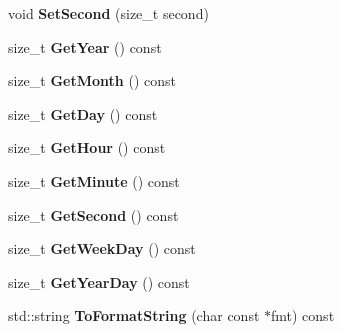 \begin{DoxyCompactItemize}
\item 
\hypertarget{classlsf_1_1util_1_1Date_aa2febb5b562ec67feb064a2233784796}{
void {\bfseries SetSecond} (size\_\-t second)}
\label{classlsf_1_1util_1_1Date_aa2febb5b562ec67feb064a2233784796}

\item 
\hypertarget{classlsf_1_1util_1_1Date_a361242a0c75f6aa38d56d86cd7ac269a}{
size\_\-t {\bfseries GetYear} () const }
\label{classlsf_1_1util_1_1Date_a361242a0c75f6aa38d56d86cd7ac269a}

\item 
\hypertarget{classlsf_1_1util_1_1Date_a790816ca0e33bc3bc11f6e916a9ef11c}{
size\_\-t {\bfseries GetMonth} () const }
\label{classlsf_1_1util_1_1Date_a790816ca0e33bc3bc11f6e916a9ef11c}

\item 
\hypertarget{classlsf_1_1util_1_1Date_adbe17431f5edb15fb3805db103aa993f}{
size\_\-t {\bfseries GetDay} () const }
\label{classlsf_1_1util_1_1Date_adbe17431f5edb15fb3805db103aa993f}

\item 
\hypertarget{classlsf_1_1util_1_1Date_a0c41a20b8a404695cef635a537ae79cb}{
size\_\-t {\bfseries GetHour} () const }
\label{classlsf_1_1util_1_1Date_a0c41a20b8a404695cef635a537ae79cb}

\item 
\hypertarget{classlsf_1_1util_1_1Date_ac7edf4c564739f8dff353835a447980e}{
size\_\-t {\bfseries GetMinute} () const }
\label{classlsf_1_1util_1_1Date_ac7edf4c564739f8dff353835a447980e}

\item 
\hypertarget{classlsf_1_1util_1_1Date_a2674a5fbb86ff6c71ba90593d39934d1}{
size\_\-t {\bfseries GetSecond} () const }
\label{classlsf_1_1util_1_1Date_a2674a5fbb86ff6c71ba90593d39934d1}

\item 
\hypertarget{classlsf_1_1util_1_1Date_aeeaa6a41633f602e2410139938b26be1}{
size\_\-t {\bfseries GetWeekDay} () const }
\label{classlsf_1_1util_1_1Date_aeeaa6a41633f602e2410139938b26be1}

\item 
\hypertarget{classlsf_1_1util_1_1Date_a8a7ad5e3a37672bd2bc7538ab23c09ae}{
size\_\-t {\bfseries GetYearDay} () const }
\label{classlsf_1_1util_1_1Date_a8a7ad5e3a37672bd2bc7538ab23c09ae}

\item 
\hypertarget{classlsf_1_1util_1_1Date_a7f8bcd89988a0b62bc720ce21e604b8c}{
std::string {\bfseries ToFormatString} (char const $\ast$fmt) const }
\label{classlsf_1_1util_1_1Date_a7f8bcd89988a0b62bc720ce21e604b8c}


\end{DoxyCompactItemize}

